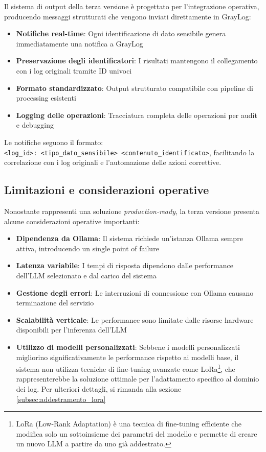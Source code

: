 \documentclass[12pt]{report}
\begin{document}
Il sistema di output della terza versione è progettato per l'integrazione operativa, producendo messaggi strutturati che vengono inviati direttamente in GrayLog:

\begin{itemize}
    \item \textbf{Notifiche real-time}: Ogni identificazione di dato sensibile genera immediatamente una notifica a GrayLog
    \item \textbf{Preservazione degli identificatori}: I risultati mantengono il collegamento con i log originali tramite ID univoci
    \item \textbf{Formato standardizzato}: Output strutturato compatibile con pipeline di processing esistenti
    \item \textbf{Logging delle operazioni}: Tracciatura completa delle operazioni per audit e debugging
\end{itemize}

Le notifiche seguono il formato: \\
\texttt{<log\_id>: <tipo\_dato\_sensibile> <contenuto\_identificato>}, facilitando la correlazione con i log originali e l'automazione delle azioni correttive.

\subsection{Limitazioni e considerazioni operative}
\label{subsec:ver3_limitazioni}

Nonostante rappresenti una soluzione \textit{production-ready}, la terza versione presenta alcune considerazioni operative importanti:

\begin{itemize}
    \item \textbf{Dipendenza da Ollama}: Il sistema richiede un'istanza Ollama sempre attiva, introducendo un single point of failure
    \item \textbf{Latenza variabile}: I tempi di risposta dipendono dalle performance dell'LLM selezionato e dal carico del sistema
    \item \textbf{Gestione degli errori}: Le interruzioni di connessione con Ollama causano terminazione del servizio
    \item \textbf{Scalabilità verticale}: Le performance sono limitate dalle risorse hardware disponibili per l'inferenza dell'LLM
    \item \textbf{Utilizzo di modelli personalizzati}: Sebbene i modelli personalizzati migliorino significativamente le performance rispetto ai modelli base, il sistema non utilizza tecniche di fine-tuning avanzate come LoRa\footnote{LoRa (Low-Rank Adaptation) è una tecnica di fine-tuning efficiente che modifica solo un sottoinsieme dei parametri del modello e permette di creare un nuovo LLM a partire da uno già addestrato.}, che rappresenterebbe la soluzione ottimale per l'adattamento specifico al dominio dei log. Per ulteriori dettagli, si rimanda alla sezione \ref{subsec:addestramento_lora}
\end{itemize}
\end{document}
